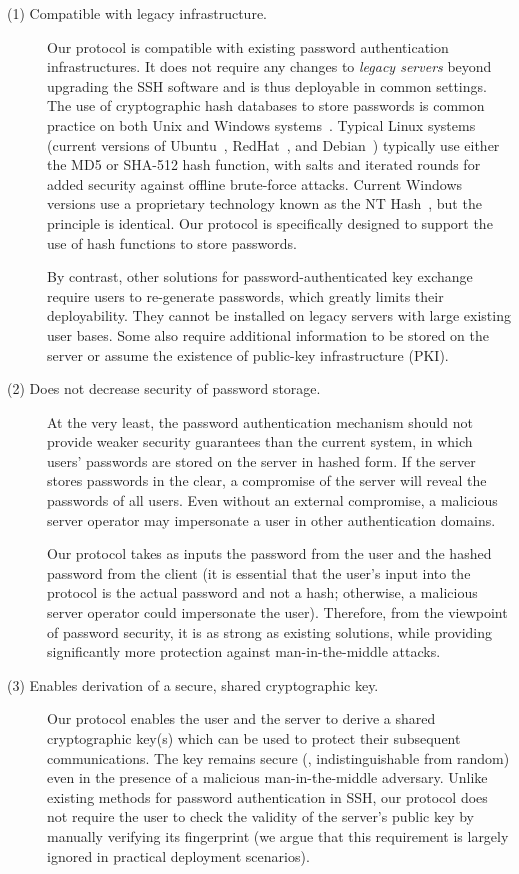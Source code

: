\begin{description}

\item[(1) Compatible with legacy infrastructure.] Our protocol is
compatible with existing password authentication infrastructures.  It
does not require any changes to \emph{legacy servers} beyond upgrading
the SSH software and is thus deployable in common settings.  The use
of cryptographic hash databases to store passwords is common practice
on both Unix and Windows systems~\cite{smith08}. Typical Linux systems
(current versions of Ubuntu~\cite{ubuntu-shadow},
RedHat~\cite{redhat-shadow}, and Debian~\cite{debian-shadow})
typically use either the MD5 or SHA-512 hash function, with salts and
iterated rounds for added security against offline brute-force
attacks. Current Windows versions use a proprietary technology known
as the NT Hash~\cite{nt-hash}, but the principle is identical. Our
protocol is specifically designed to support the use of hash functions
to store passwords.

By contrast, other solutions for password-authenticated key exchange
require users to re-generate passwords, which greatly limits their
deployability.  They cannot be installed on legacy servers with large
existing user bases.  Some also require additional information to be
stored on the server or assume the existence of public-key
infrastructure (PKI).

\item[(2) Does not decrease security of password storage.] At the very
least, the password authentication mechanism should not provide weaker
security guarantees than the current system, in which users' passwords
are stored on the server in hashed form.  If the server stores
passwords in the clear, a compromise of the server will reveal the
passwords of all users.  Even without an external compromise, a
malicious server operator may impersonate a user in other
authentication domains.

Our protocol takes as inputs the password from the user and the hashed
password from the client (it is essential that the user's input into
the protocol is the actual password and not a hash; otherwise, a
malicious server operator could impersonate the user).  Therefore,
from the viewpoint of password security, it is as strong as existing
solutions, while providing significantly more protection against
man-in-the-middle attacks.

\item[(3) Enables derivation of a secure, shared cryptographic key.]
Our protocol enables the user and the server to derive a shared
cryptographic key(s) which can be used to protect their subsequent
communications.  The key remains secure (\ie, indistinguishable from
random) even in the presence of a malicious man-in-the-middle
adversary.  Unlike existing methods for password authentication in
SSH, our protocol does not require the user to check the validity of
the server's public key by manually verifying its fingerprint (we
argue that this requirement is largely ignored in practical deployment
scenarios).


\end{description}
